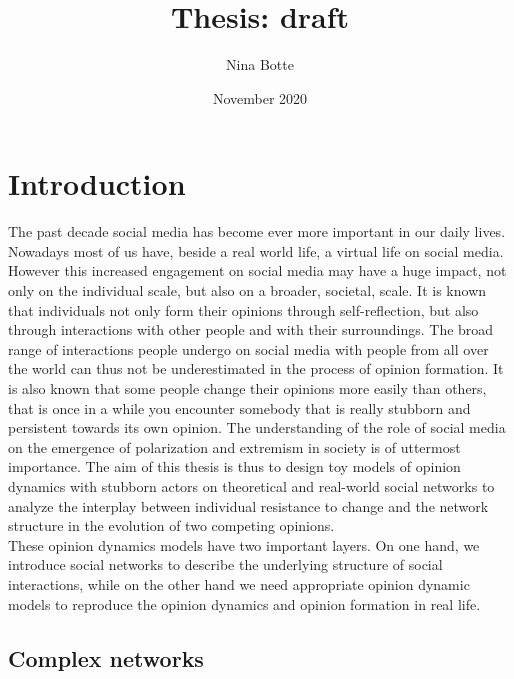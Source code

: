 \documentclass{article}
\title{Thesis: draft}
\author{Nina Botte }
\date{November 2020}
\begin{document}
\maketitle

\section{Introduction}
The past decade social media has become ever more important in our daily lives. Nowadays most of us have, beside a real world life, a virtual life on social media. However this increased engagement on social media may have a huge impact, not only on the individual scale, but also on a broader, societal, scale. It is known that individuals not only form their opinions through self-reflection, but also through interactions with other people and with their surroundings. The broad range of interactions people undergo on social media with people from all over the world can thus not be underestimated in the process of opinion formation. It is also known that some people change their opinions more easily than others, that is once in a while you encounter somebody that is really stubborn and persistent towards its own opinion. The understanding of the role of social media on the emergence of polarization and extremism in society is of uttermost importance. The aim of this thesis is thus to design toy models of opinion dynamics with stubborn actors on theoretical and real-world social networks to analyze the interplay between individual resistance to change and the network structure in the evolution of two competing opinions.\\
These opinion dynamics models have two important layers. On one hand, we introduce social networks to describe the underlying structure of social interactions, while on the other hand we need appropriate opinion dynamic models to reproduce the opinion dynamics and opinion formation in real life. 

\subsection{Complex networks}
\end{document}
